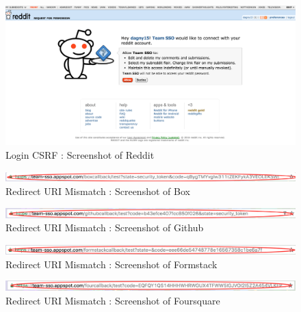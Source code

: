 \begin{figure}[t]
   		 \centering
   		 \includegraphics[width=\columnwidth]{figures/vulnerable/reddit.png}
   		 \caption{Login CSRF : Screenshot of Reddit}
   		 \label{fig:redditlogin}
\end{figure}

\begin{figure}[t]
   		 \centering
   		 \includegraphics[width=\columnwidth]{figures/box1.png}
   		 \caption{Redirect URI Mismatch : Screenshot of Box}
   		 \label{fig:boxredir}
\end{figure}

\begin{figure}[t]
   		 \centering
   		 \includegraphics[width=\columnwidth]{figures/github1.png}
   		 \caption{Redirect URI Mismatch : Screenshot of Github}
   		 \label{fig:githubredir}
\end{figure}
\begin{figure}[t]
   		 \centering
   		 \includegraphics[width=\columnwidth]{figures/formstack1.png}
   		 \caption{Redirect URI Mismatch : Screenshot of Formstack}
   		 \label{fig:formstackredir}
\end{figure}

\begin{figure}[t]
   		 \centering
   		 \includegraphics[width=\columnwidth]{figures/four1.png}
   		 \caption{Redirect URI Mismatch : Screenshot of Foursquare}
   		 \label{fig:fourredir}
\end{figure}


